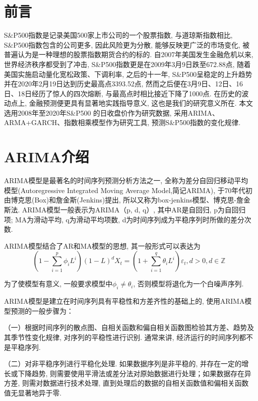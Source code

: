 \documentclass[11pt]{article}
\begin{document}
% 
\tableofcontents


\newpage
\section{前言}
\qquad S\&P500指数是记录美国500家上市公司的一个股票指数, 与道琼斯指数相比, S\&P500指数包含的公司更多, 因此风险更为分散, 能够反映更广泛的市场变化, 被普遍认为是一种理想的股票指数期货合约的标的. 自2007年美国发生金融危机以来, 世界经济秩序都受到了冲击, S\&P500指数更是在2009年3月9日跌至672.88点, 随着美国实施启动量化宽松政策、下调利率, 之后的十一年, S\&P500呈稳定的上升趋势并在2020年2月19日达到历史最高点3393.52点, 然而之后便在3月9日、12日、16日、18日经历了惊人的四次熔断, 与最高点时相比接近下降了1000点. 在历史的波动点上, 金融预测便更具有显著地实践指导意义, 这也是我们的研究意义所在. 本文选用2008年至2020年S\&P500 的日收盘价作为研究数据, 采用ARIMA、ARMA+GARCH、指数相乘模型作为研究工具, 预测S\&P500指数的变化规律. 

\section{ARIMA介绍}

\qquad ARIMA模型是最著名的时间序列预测分析方法之一, 全称为差分自回归移动平均模型(Autoregressive Integrated Moving Average Model,简记ARIMA), 于70年代初由博克思(Box)和詹金斯(Jenkins)提出, 所以又称为box-jenkins模型、博克思-詹金斯法. ARIMA模型一般表示为ARIMA（p, d, q）, 其中AR是自回归, p为自回归项; MA为滑动平均, q为滑动平均项数, d为时间序列成为平稳序列时所做的差分次数. 

\qquad ARIMA模型结合了AR和MA模型的思想, 其一般形式可以表达为
\[
(1-\sum_{i=1}^p \phi_i L^i)(1-L)^d X_t = (1+\sum_{i=1}^q \theta_i L^i)\varepsilon_t,d>0,d \in \mathbb{Z}
\]

为了使模型有意义, 一般要求模型中$\phi_i \ne \theta_i$, 否则模型将退化为一个白噪声序列. 

\qquad ARIMA模型是建立在时间序列具有平稳性和方差齐性的基础上的, 使用ARIMA模型预测的一般步骤为：

\qquad （一）根据时间序列的散点图、自相关函数和偏自相关函数图检验其方差、趋势及其季节性变化规律, 对序列的平稳性进行识别. 通常来讲,  经济运行的时间序列都不是平稳序列. 

\qquad （二）对非平稳序列进行平稳化处理. 如果数据序列是非平稳的, 并存在一定的增长或下降趋势, 则需要使用平滑法或差分法对原始数据进行处理；如果数据存在异方差, 则需对数据进行技术处理, 直到处理后的数据的自相关函数值和偏相关函数值无显著地异于零. 
\end{document}

